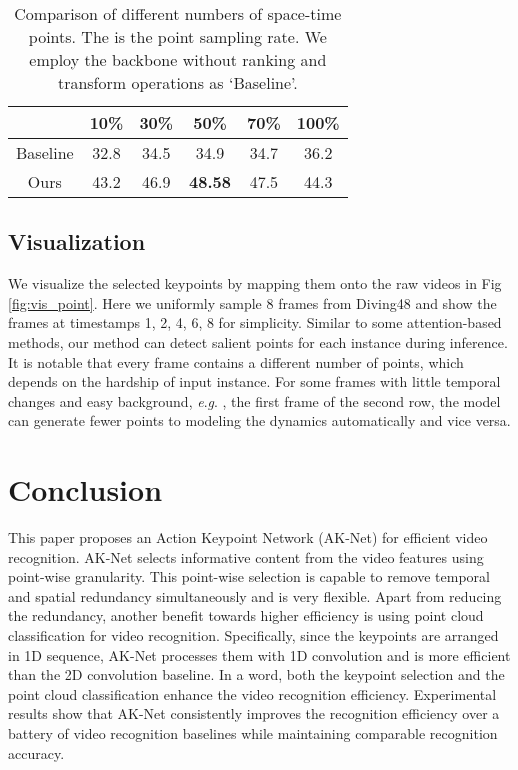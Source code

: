 \documentclass[journal]{IEEEtran}
\newcommand{\eg}{\textit{e}.\textit{g}. }
\begin{document}
\begin{table}[ht]
    \centering
    \caption{Comparison of different numbers of space-time points.
    The  is the point sampling rate.
    We employ the backbone without ranking and transform operations as `Baseline'.
    }
    \label{tab:point_rate}
	\begin{tabular}{cccccc} \hline
		 & 10\%   & 30\%   & 50\%    & 70\%   & 100\%  \\ \hline
		Baseline & 32.8    & 34.5 & 34.9  & 34.7 & 36.2   \\
		Ours       & 43.2 & 46.9 & \textbf{48.58} & 47.5 & 44.3 \\ \hline
	\end{tabular}
\end{table}

\subsection{Visualization}
We visualize the selected keypoints by mapping them onto the raw videos in Fig \ref{fig:vis_point}.
Here we uniformly sample 8 frames from Diving48 and show the frames at timestamps 1, 2, 4, 6, 8 for simplicity.
Similar to some attention-based methods, our method can detect salient points for each instance during inference.
It is notable that every frame contains a different number of points, which depends on the hardship of input instance.
For some frames with little temporal changes and easy background, \eg, the first frame of the second row, the model can generate fewer points to modeling the dynamics automatically and vice versa.

\section{Conclusion}\label{sec:conclusion}

This paper proposes an Action Keypoint Network (AK-Net) for efficient video recognition. AK-Net  selects informative content from the video features using point-wise granularity. This point-wise selection is capable to remove temporal and spatial redundancy simultaneously and is very flexible. Apart from reducing the redundancy, another benefit towards higher efficiency is using point cloud classification for video recognition. Specifically, since the keypoints are arranged in 1D sequence, AK-Net processes them with 1D convolution and is more efficient than the 2D convolution baseline. In a word, both the keypoint selection and the point cloud classification enhance the video recognition efficiency. Experimental results show that AK-Net consistently improves the recognition efficiency over a battery of video recognition baselines while maintaining comparable recognition accuracy. 



\end{document}
